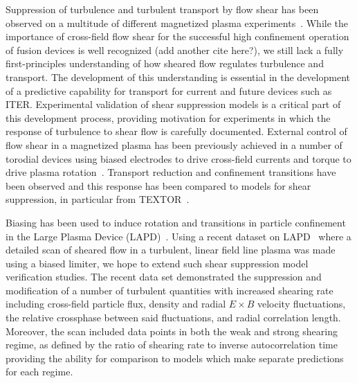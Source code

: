 \documentclass[aip,pop,amsmath,amssymb,preprint,superscriptaddress]{revtex4-1} %
\begin{document}
Suppression of turbulence and turbulent transport by flow shear has been observed on a multitude of different magnetized plasma experiments~\cite{burrell97, burrell99,terry00,oost03,sakai93,schaffner12}. While the importance of cross-field flow shear for the successful high confinement operation of fusion devices is well recognized (add another cite here?), we still lack a fully first-principles understanding of how sheared flow regulates turbulence and transport.  The development of this understanding is essential in the development of a predictive capability for transport for current and future devices such as ITER.    Experimental validation of shear suppression models is a critical part of this development process, providing motivation for experiments in which the response of turbulence to shear flow is carefully documented.  External control of flow shear in a magnetized plasma has been previously achieved in a number of torodial devices using biased electrodes to drive cross-field currents and torque to drive plasma rotation~\cite{taylor89,weynants92}.   Transport reduction and confinement transitions have been observed and this response has been compared to models for shear suppression, in particular  from TEXTOR~\cite{weynants98,boedo00,boedo02}.


Biasing has been used to induce rotation and transitions in particle confinement in the Large Plasma Device (LAPD)~\cite{maggs07,carter09}.  Using a recent dataset on LAPD~\cite{schaffner12} where a detailed scan of sheared flow in a turbulent, linear field line plasma was made using a biased limiter, we hope to extend such shear suppression model verification studies. The recent data set demonstrated the suppression and modification of a number of turbulent quantities with increased shearing rate including cross-field particle flux, density and radial $E\times B$ velocity fluctuations, the relative crossphase between said fluctuations, and radial correlation length. Moreover, the scan included data points in both the weak and strong shearing regime, as defined by the ratio of shearing rate to inverse autocorrelation time providing the ability for comparison to models which make separate predictions for each regime.
\end{document}
